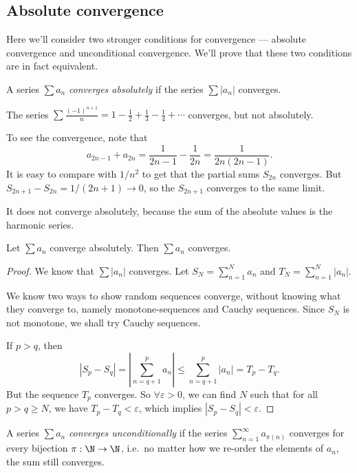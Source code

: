\documentclass[a4paper]{article}
\begin{document}
\subsection{Absolute convergence}
Here we'll consider two stronger conditions for convergence --- absolute convergence and unconditional convergence. We'll prove that these two conditions are in fact equivalent.
\begin{defi}
  A series $\sum a_n$ \emph{converges absolutely} if the series $\sum |a_n|$ converges.
\end{defi}

\begin{eg}
  The series $\sum \frac{(-1)^{n + 1}}{n} = 1 - \frac{1}{2} + \frac{1}{3} - \frac{1}{4} + \cdots$ converges, but not absolutely.

  To see the convergence, note that
  \[
    a_{2n - 1} + a_{2n} = \frac{1}{2n - 1} - \frac{1}{2n} = \frac{1}{2n(2n- 1)}.
  \]
  It is easy to compare with $1/n^2$ to get that the partial sums $S_{2n}$ converges. But $S_{2n + 1} - S_{2n} = 1/(2n + 1) \to 0$, so the $S_{2n + 1}$ converges to the same limit.

  It does not converge absolutely, because the sum of the absolute values is the harmonic series.
\end{eg}

\begin{lemma}
  Let $\sum a_n$ converge absolutely. Then $\sum a_n$ converges.
\end{lemma}

\begin{proof}
  We know that $\sum |a_n|$ converges. Let $S_N = \sum_{n = 1}^N a_n$ and $T_N = \sum_{n = 1}^N |a_n|$.

  We know two ways to show random sequences converge, without knowing what they converge to, namely monotone-sequences and Cauchy sequences. Since $S_N$ is not monotone, we shall try Cauchy sequences.

  If $p > q$, then
  \[
    |S_p - S_q| = \left|\sum_{n = q + 1}^p a_n\right| \leq \sum_{n = q + 1}^p |a_n| = T_p - T_q.
  \]
  But the sequence $T_p$ converges. So $\forall \varepsilon > 0$, we can find $N$ such that for all $p > q \geq N$, we have $T_p - T_q < \varepsilon$, which implies $|S_p - S_q| < \varepsilon$.
\end{proof}

\begin{defi}
  A series $\sum a_n$ \emph{converges unconditionally} if the series $\sum_{n = 1}^{\infty} a_{\pi(n)}$ converges for every bijection $\pi: \N \to \N$, i.e.\ no matter how we re-order the elements of $a_n$, the sum still converges.
\end{defi}
\end{document}
